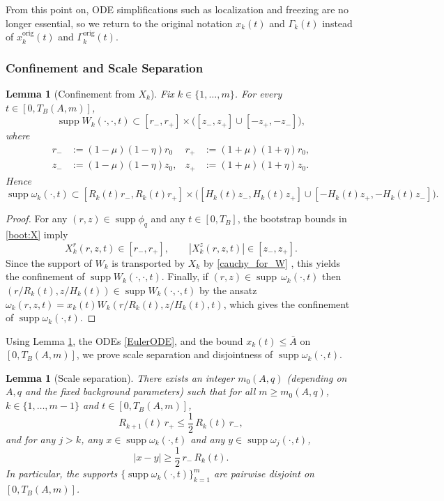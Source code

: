\documentclass[reqno,11pt]{amsart}
\newtheorem{lemma}[theorem]{Lemma}
\newcommand{\supp}{\operatorname{supp}}
\begin{document}
From this point on, ODE simplifications such as localization and freezing are no longer essential, so we return to the original notation $x_k(t)$ and $\Gamma_k(t)$ instead of $x_k^{\mathrm{orig}}(t)$ and $\Gamma_k^{\mathrm{orig}}(t)$.

\subsubsection{Confinement and Scale Separation}



\begin{lemma}[Confinement from $X_k$]\label{lem:Euler_cauchy_geometry}
Fix $k\in\{1,\dots,m\}$.
For every $t\in[0,T_B(A,m)]$,
\[
\supp W_k(\cdot,\cdot,t)\subset [r_-,r_+]\times\bigl([z_-,z_+]\cup[-z_+,-z_-]\bigr),
\]
where
\begin{align*}
r_-&:=(1-\mu)(1-\eta)r_0
&
r_+&:=(1+\mu)(1+\eta)r_0,
\\
z_-&:=(1-\mu)(1-\eta)z_0,
&
z_+&:=(1+\mu)(1+\eta)z_0.
\end{align*}
Hence
\[
\supp\omega_k(\cdot,t)\subset
[R_k(t)r_-,R_k(t)r_+]\times 
\Big( 
[H_k(t)z_-,H_k(t)z_+] \cup
[-H_k(t)z_+, -H_k(t)z_-]
\Big).
\]
\end{lemma}

\begin{proof}

For any $(r,z)\in\supp\phi_q $ and any $t\in[0,T_B]$, the bootstrap bounds in \eqref{boot:X} imply
\[
X_{k}^r(r,z,t)\in[r_-,r_+],\qquad |X_{k}^z(r,z,t)|\in[z_-,z_+].
\]
 Since the support of $W_k$ is transported by $X_k$ by \eqref{cauchy_for_W} , this yields the confinement of $\supp W_k(\cdot,\cdot,t)$. Finally, if $(r,z)\in\supp \, \omega_k (\cdot,t)$ then $(r/R_k(t),z/H_k(t))\in\supp W_k(\cdot,\cdot,t)$ by the ansatz $\omega_k(r,z,t)=x_k(t)W_k(r/R_k(t),z/H_k(t),t)$, which gives the confinement of $\supp \omega_k (\cdot,t)$.
\end{proof}


Using Lemma \ref{lem:Euler_cauchy_geometry}, the ODEs \eqref{EulerODE}, and the bound $x_k(t) \leq \bar A$ on $[0,T_B(A,m)]$, we prove scale separation and disjointness of $\supp \omega_k(\cdot,t)$.
\begin{lemma}[Scale separation]\label{lem:Euler_scale_separation}
There exists an integer $m_0(A,q)$ (depending on $A,q$ and the fixed background parameters) such that 
for all $m\geq m_0(A,q)$, $k\in \{1,\ldots,m-1\}$ and $t\in[0,T_B(A,m)]$,
\begin{equation}\label{eq:sep_R_ratio}
R_{k+1}(t)\,r_+\le \frac12\,R_k(t)\,r_-,
\end{equation}
and for any $j>k$, any $x\in \supp \omega_k(\cdot,t)$ and any $y\in\supp \omega_j(\cdot,t)$,
\begin{equation}\label{eq:sep_distance_estimate}
|x-y|\ge \frac12\,r_-\,R_k(t).
\end{equation}
In particular, the supports $\{\supp \omega_k(\cdot,t)\}_{k=1}^m$ are pairwise disjoint on $[0,T_B(A,m)]$.
\end{lemma}
\end{document}
